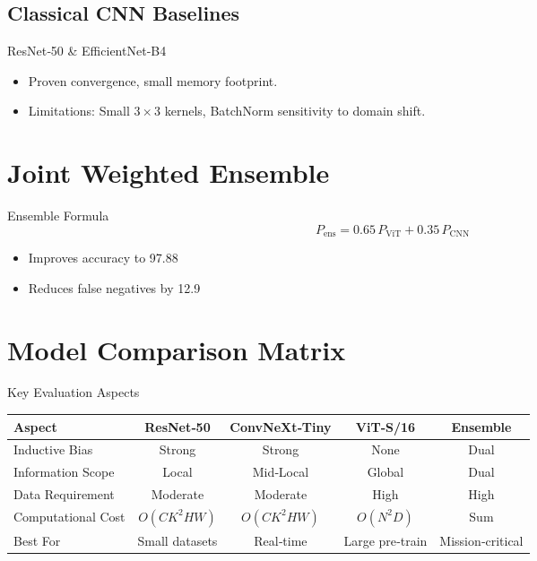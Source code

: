 \documentclass{beamer}
\begin{document}
\subsection{Classical CNN Baselines}
\begin{frame}{ResNet‑50 & EfficientNet‑B4}
  \begin{itemize}
    \item Proven convergence, small memory footprint.
    \item Limitations: Small $3\times3$ kernels, BatchNorm sensitivity to domain shift.
  \end{itemize}
\end{frame}

\section{Joint Weighted Ensemble}
\begin{frame}{Ensemble Formula}
  \[ P_{\text{ens}} = 0.65\,P_{\text{ViT}} + 0.35\,P_{\text{CNN}} \]
  \begin{itemize}
    \item Improves accuracy to 97.88 %
    \item Reduces false negatives by 12.9 %
  \end{itemize}
\end{frame}

\section{Model Comparison Matrix}
\begin{frame}{Key Evaluation Aspects}
  \begin{tabular}{lcccc}
    \toprule
    Aspect & ResNet‑50 & ConvNeXt‑Tiny & ViT‑S/16 & Ensemble \\
    \midrule
    Inductive Bias & Strong & Strong & None & Dual \\
    Information Scope & Local & Mid‑Local & Global & Dual \\
    Data Requirement & Moderate & Moderate & High & High \\
    Computational Cost & $O(C K^2 HW)$ & $O(C K^2 HW)$ & $O(N^2 D)$ & Sum \\
    Best For & Small datasets & Real‑time & Large pre‑train & Mission‑critical \\
    \bottomrule
  \end{tabular}
\end{frame}
\end{document}
